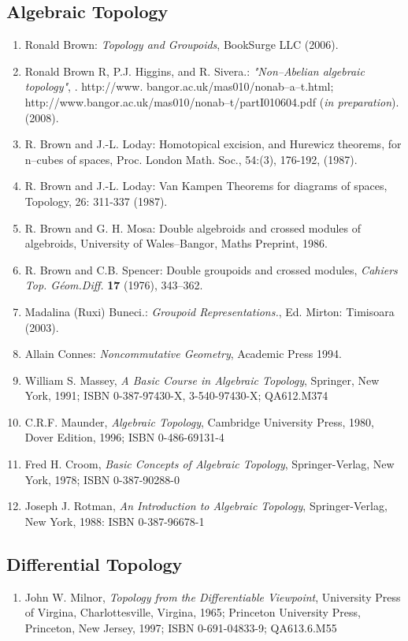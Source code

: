 \documentclass[12pt]{article}
\begin{document}
\subsection*{Algebraic Topology}
\begin{enumerate}
\item Ronald Brown: \emph{Topology and Groupoids}, BookSurge LLC (2006).
\item Ronald Brown R, P.J. Higgins, and R. Sivera.: \emph{"Non--Abelian algebraic topology"}, . http://www. bangor.ac.uk/mas010/nonab--a--t.html; http://www.bangor.ac.uk/mas010/nonab--t/partI010604.pdf  (\textit{in preparation}). (2008).
\item R. Brown and J.-L. Loday: Homotopical excision, and Hurewicz theorems, for n--cubes of spaces, Proc. London Math. Soc., 54:(3), 176-192, (1987).
\item R. Brown and J.-L. Loday: Van Kampen Theorems for diagrams of spaces, Topology, 26: 311-337 (1987).
\item R. Brown and G. H. Mosa: Double algebroids and crossed modules of algebroids, University of Wales--Bangor, Maths Preprint, 1986.
\item  R. Brown  and C.B. Spencer: Double groupoids and crossed modules, \emph{Cahiers Top. G\'eom.Diff.} \textbf{17} (1976), 343--362.

\item Madalina (Ruxi) Buneci.: \emph{Groupoid Representations.}, Ed. Mirton: Timisoara (2003).

\item Allain Connes: \emph{Noncommutative Geometry}, Academic Press 1994.
\item William S. Massey, \emph{A Basic Course in Algebraic Topology}, Springer, New York, 1991; ISBN 0-387-97430-X, 3-540-97430-X; QA612.M374
\item C.R.F. Maunder, \emph{Algebraic Topology}, Cambridge University Press, 1980, Dover Edition, 1996; ISBN 0-486-69131-4
\item Fred H. Croom, \emph{Basic Concepts of Algebraic Topology}, Springer-Verlag, New York, 1978; ISBN 0-387-90288-0
\item Joseph J. Rotman, \emph{An Introduction to Algebraic Topology}, Springer-Verlag, New York, 1988: ISBN 0-387-96678-1
\end{enumerate}

\subsection*{Differential Topology}
\begin{enumerate}
\item John W. Milnor, \emph{Topology from the Differentiable Viewpoint}, University Press of Virgina, Charlottesville, Virgina, 1965; Princeton University Press, Princeton, New Jersey, 1997; ISBN 0-691-04833-9; QA613.6.M55
\end{enumerate}
\end{document}
